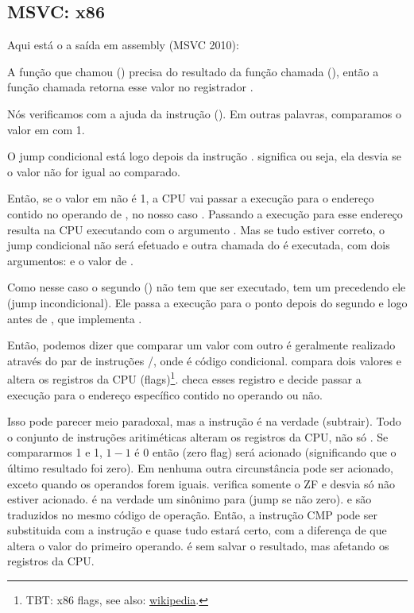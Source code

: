 \subsection{MSVC: x86}

Aqui está o a saída em assembly (MSVC 2010):



A função que chamou (\main) precisa do resultado da função chamada (\scanf),
então a função chamada retorna esse valor no registrador \EAX.

Nós verificamos com a ajuda da instrução  (). Em outras palavras, comparamos o valor em \EAX com 1.

O jump condicional \JNE está logo depois da instrução \CMP. \JNE significa  ou seja, ela desvia se o valor não for igual ao comparado.

Então, se o valor em \EAX não é 1, a \ac{CPU} vai passar a execução para o endereço contido no operando de \JNE, no nosso caso .
Passando a execução para esse endereço resulta na \ac{CPU} executando \printf com o argumento .
Mas se tudo estiver correto, o jump condicional não será efetuado e outra chamada do \printf é executada, com dois argumentos:  e o valor de .

Como nesse caso o segundo \printf() não tem que ser executado, tem um \JMP precedendo ele (jump incondicional).
Ele passa a execução para o ponto depois do segundo \printf e logo antes de , que implementa .

Então, podemos dizer que comparar um valor com outro é geralmente realizado através do par de instruções \CMP/\Jcc, onde  é código condicional.
\CMP compara dois valores e altera os registros da \ac{CPU} (flags)\footnote{\ac{TBT}: x86 flags, see also: \href{http://go.yurichev.com/17120}{wikipedia}.}.
\Jcc checa esses registro e decide passar a execução para o endereço específico contido no operando ou não.

\label{CMPandSUB}
Isso pode parecer meio paradoxal, mas a instrução \CMP é na verdade \SUB (subtrair).
Todo o conjunto de instruções aritiméticas alteram os registros da \ac{CPU}, não só \CMP.
Se compararmos 1 e 1, $1-1$ é 0 então \ZF (zero flag) será acionado (significando que o último resultado foi zero).
Em nenhuma outra circunstância \ZF pode ser acionado, exceto quando os operandos forem iguais.
\JNE verifica somente o ZF e desvia só não estiver acionado.
\JNE é na verdade um sinônimo para \JNZ (jump se não zero).
\JNE e \JNZ são traduzidos no mesmo código de operação.
Então, a instrução CMP pode ser substituida com a instrução \SUB e quase tudo estará certo, com a diferença de que \SUB altera o valor do primeiro operando.
\CMP é \SUB sem salvar o resultado, mas afetando os registros da \ac{CPU}.

